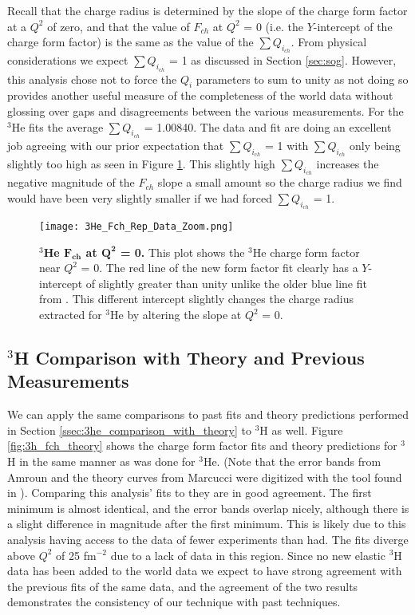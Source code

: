 Recall that the charge radius is determined by the slope of the charge form factor at a $Q^2$ of zero, and that the value of $F_{ch}$ at $Q^2$ = 0 (i.e. the $Y$-intercept of the charge form factor) is the same as the value of the $\sum Q_{i_{ch}}$. From physical considerations we expect $\sum Q_{i_{ch}}$ = 1 as discussed in Section \ref{sec:sog}. However, this analysis chose not to force the $Q_i$ parameters to sum to unity as not doing so provides another useful measure of the completeness of the world data without glossing over gaps and disagreements between the various measurements. For the $^3$He fits the average $\sum Q_{i_{ch}}$ = 1.00840. The data and fit are doing an excellent job agreeing with our prior expectation that $\sum Q_{i_{ch}}$ = 1 with $\sum Q_{i_{ch}}$ only being slightly too high as seen in Figure \ref{fig:3he_fch_zoom}. This slightly high $\sum Q_{i_{ch}}$ increases the negative magnitude of the $F_{ch}$ slope a small amount so the charge radius we find would have been very slightly smaller if we had forced $\sum Q_{i_{ch}}$ = 1. 

\begin{figure}[!ht]
	\begin{center}
	\texttt{[image: 3He\_Fch\_Rep\_Data\_Zoom.png]}
	\end{center}
	\caption[$^3$He $F_{ch}$ at $Q^2$ = 0]{
	{\bf{$^3$He $\boldsymbol{F_{ch}}$ at $\boldsymbol{Q^2}$ = 0.}} This plot shows the $^3$He charge form factor near $Q^2$ = 0. The red line of the new form factor fit clearly has a $Y$-intercept of slightly greater than unity unlike the older blue line fit from \cite{Article:Amroun}. This different intercept slightly changes the charge radius extracted for $^3$He by altering the slope at $Q^2$ = 0.}
	\label{fig:3he_fch_zoom}
\end{figure}

\subsection{$^3$H Comparison with Theory and Previous Measurements}
\label{ssec:3h_comparison_with_theory}

We can apply the same comparisons to past fits and theory predictions performed in Section \ref{ssec:3he_comparison_with_theory} to $^3$H as well. Figure \ref{fig:3h_fch_theory} shows the charge form factor fits and theory predictions for $^3$H in the same manner as was done for $^3$He. (Note that the error bands from Amroun and the theory curves from Marcucci were digitized with the tool found in \cite{web_plot_digitizer}). Comparing this analysis' fits to \cite{Article:Amroun} they are in good agreement. The first minimum is almost identical, and the error bands overlap nicely, although there is a slight difference in magnitude after the first minimum. This is likely due to this analysis having access to the data of fewer experiments than \cite{Article:Amroun} had. The fits diverge above $Q^2$ of 25 fm$^{-2}$ due to a lack of data in this region. Since no new elastic $^3$H data has been added to the world data we expect to have strong agreement with the previous fits of the same data, and the agreement of the two results demonstrates the consistency of our technique with past techniques. 

